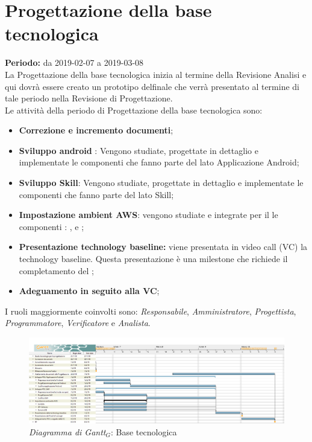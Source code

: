 \section{Progettazione della base tecnologica}
\textbf{Periodo:} da 2019-02-07 a 2019-03-08\\
La Progettazione della base tecnologica inizia al termine della Revisione Analisi e qui dovrà essere creato un prototipo delfinale che verrà presentato al termine di tale periodo nella Revisione di Progettazione.\\
Le attività della periodo di Progettazione della base tecnologica sono:
\begin{itemize}
	\item \textbf{Correzione e incremento documenti};
	\item \textbf{Sviluppo android }: Vengono studiate, progettate in dettaglio e implementate le componenti che fanno parte del  lato Applicazione Android; 
	\item \textbf{Sviluppo Skill}: Vengono studiate, progettate in dettaglio e implementate le componenti che fanno parte del  lato Skill; 
    \item\textbf{Impostazione ambient AWS}: vengono studiate e integrate per il  le componenti : ,  e ;
    \item \textbf{Presentazione technology baseline:} viene presentata in video call (VC) la technology baseline. Questa presentazione è una milestone che richiede il completamento del ;
    \item \textbf{Adeguamento  in seguito alla VC};
\end{itemize}
I ruoli maggiormente coinvolti sono: \textit{Responsabile}, \textit{Amministratore}, \textit{Progettista}, \textit{Programmatore}, \textit{Verificatore} e \textit{Analista}.
\begin{figure} [h]
    \centering
    \includegraphics[scale=0.2]{./images/ZeroSevenGanttProgettazione.png}
    \caption{\textit{Diagramma di Gantt$_{G}$}: Base tecnologica }\label{}
\end{figure}
\newpage
